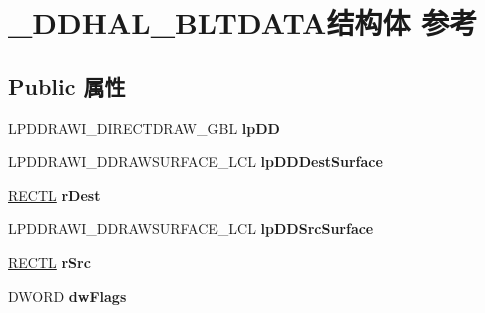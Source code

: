 \hypertarget{struct___d_d_h_a_l___b_l_t_d_a_t_a}{}\section{\+\_\+\+D\+D\+H\+A\+L\+\_\+\+B\+L\+T\+D\+A\+T\+A结构体 参考}
\label{struct___d_d_h_a_l___b_l_t_d_a_t_a}
\subsection*{Public 属性}
\begin{DoxyCompactItemize}
\item 
\mbox{\label{struct___d_d_h_a_l___b_l_t_d_a_t_a_a20e166b29a78afa194dbe03fd7676ab6}} 
L\+P\+D\+D\+R\+A\+W\+I\+\_\+\+D\+I\+R\+E\+C\+T\+D\+R\+A\+W\+\_\+\+G\+BL {\bfseries lp\+DD}
\item 
\mbox{\label{struct___d_d_h_a_l___b_l_t_d_a_t_a_a4ba5552d450ece8e0a18a6803a1e951d}} 
L\+P\+D\+D\+R\+A\+W\+I\+\_\+\+D\+D\+R\+A\+W\+S\+U\+R\+F\+A\+C\+E\+\_\+\+L\+CL {\bfseries lp\+D\+D\+Dest\+Surface}
\item 
\mbox{\label{struct___d_d_h_a_l___b_l_t_d_a_t_a_a86b50722e7ba16081de04b6fa735cfad}} 
\hyperlink{struct___r_e_c_t_l}{R\+E\+C\+TL} {\bfseries r\+Dest}
\item 
\mbox{\label{struct___d_d_h_a_l___b_l_t_d_a_t_a_a079a4f178f8622a2f8ed86ab4fe03ca7}} 
L\+P\+D\+D\+R\+A\+W\+I\+\_\+\+D\+D\+R\+A\+W\+S\+U\+R\+F\+A\+C\+E\+\_\+\+L\+CL {\bfseries lp\+D\+D\+Src\+Surface}
\item 
\mbox{\label{struct___d_d_h_a_l___b_l_t_d_a_t_a_a0c500e8b4255b8da25163c3d5779c58d}} 
\hyperlink{struct___r_e_c_t_l}{R\+E\+C\+TL} {\bfseries r\+Src}
\item 
\mbox{\label{struct___d_d_h_a_l___b_l_t_d_a_t_a_a2c37236ff342e6ca99c0997994f48301}} 
D\+W\+O\+RD {\bfseries dw\+Flags}
\item 
\mbox{\label{struct___d_d_h_a_l___b_l_t_d_a_t_a_a0b6ad702085065e19ff38c816087947b}} 

\end{DoxyCompactItemize}
